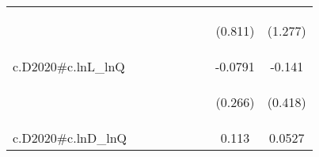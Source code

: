 \documentclass[]{article}
\begin{document}
\begin{center}
\begin{tabular}{lcccccccc}
\vspace{4pt} & \begin{footnotesize}\end{footnotesize} & \begin{footnotesize}\end{footnotesize} & \begin{footnotesize}\end{footnotesize} & \begin{footnotesize}\end{footnotesize} & \begin{footnotesize}\end{footnotesize} & \begin{footnotesize}\end{footnotesize} & \begin{footnotesize}(0.811)\end{footnotesize} & \begin{footnotesize}(1.277)\end{footnotesize} \\
c.D2020\#c.lnL\_lnQ &  &  &  &  &  &  & -0.0791 & -0.141 \\
\vspace{4pt} & \begin{footnotesize}\end{footnotesize} & \begin{footnotesize}\end{footnotesize} & \begin{footnotesize}\end{footnotesize} & \begin{footnotesize}\end{footnotesize} & \begin{footnotesize}\end{footnotesize} & \begin{footnotesize}\end{footnotesize} & \begin{footnotesize}(0.266)\end{footnotesize} & \begin{footnotesize}(0.418)\end{footnotesize} \\
c.D2020\#c.lnD\_lnQ &  &  &  &  &  &  & 0.113 & 0.0527 \\

\end{tabular}
\end{center}
\end{document}
